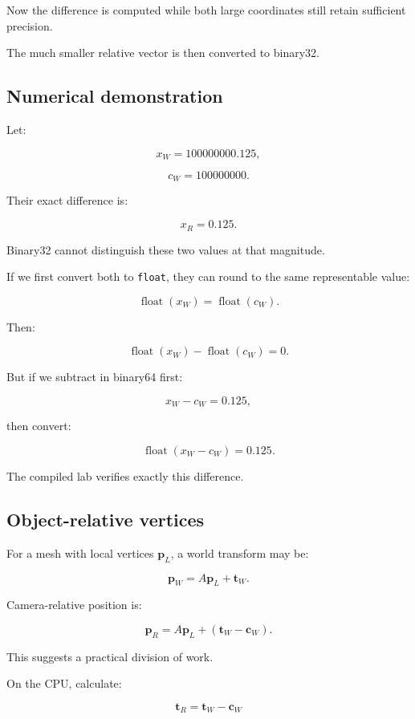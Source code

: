 Now the difference is computed while both large coordinates still retain sufficient precision.

The much smaller relative vector is then converted to binary32.

\subsection{Numerical demonstration}\label{02-foundations-ii-ch036-numerical-demonstration}

Let:

\[
 x_W=100000000.125,
\]

\[
 c_W=100000000.
\]

Their exact difference is:

\[
 \boxed{x_R=0.125}.
\]

Binary32 cannot distinguish these two values at that magnitude.

If we first convert both to \texttt{float}, they can round to the same representable value:

\[
 \operatorname{float}(x_W) = \operatorname{float}(c_W).
\]

Then:

\[
 \boxed{ \operatorname{float}(x_W) - \operatorname{float}(c_W)=0 }.
\]

But if we subtract in binary64 first:

\[
 x_W-c_W=0.125,
\]

then convert:

\[
 \boxed{ \operatorname{float}(x_W-c_W)=0.125 }.
\]

The compiled lab verifies exactly this difference.

\subsection{Object-relative vertices}\label{02-foundations-ii-ch036-object-relative-vertices}

For a mesh with local vertices \(\mathbf p_L\), a world transform may be:

\[
 \mathbf p_W=A\mathbf p_L+\mathbf t_W.
\]

Camera-relative position is:

\[
 \mathbf p_R= A\mathbf p_L+(\mathbf t_W-\mathbf c_W).
\]

This suggests a practical division of work.

On the CPU, calculate:

\[
 \boxed{ \mathbf t_R=\mathbf t_W-\mathbf c_W }
\]


